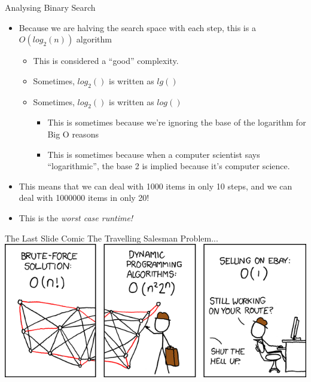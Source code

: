 \documentclass[11pt]{beamer}
\begin{document}
\begin{frame}{Analysing Binary Search}
\begin{itemize}
\item Because we are halving the search space with each step, this is a $O(log_2(n))$ algorithm 
\begin{itemize}
\item This is considered a ``good'' complexity.
\item Sometimes, $log_2()$ is written as $lg()$
\item Sometimes, $log_2()$ is written as $log()$
\begin{itemize}
\item This is sometimes because we're ignoring the base of the logarithm for Big O reasons
\item This is sometimes because when a computer scientist says ``logarithmic'', the base 2 is implied because it's computer science.
\end{itemize}
\end{itemize}
\item This means that we can deal with 1000 items in only 10 steps, and we can deal with 1000000 items in only 20! 
\item This is the \emph{worst case runtime!}
\end{itemize}
\end{frame}

\begin{frame}{The Last Slide Comic}
The Travelling Salesman Problem...
\center
\includegraphics[scale=0.4]{travelling_salesman_problem.png}
\end{frame}
\end{document}

